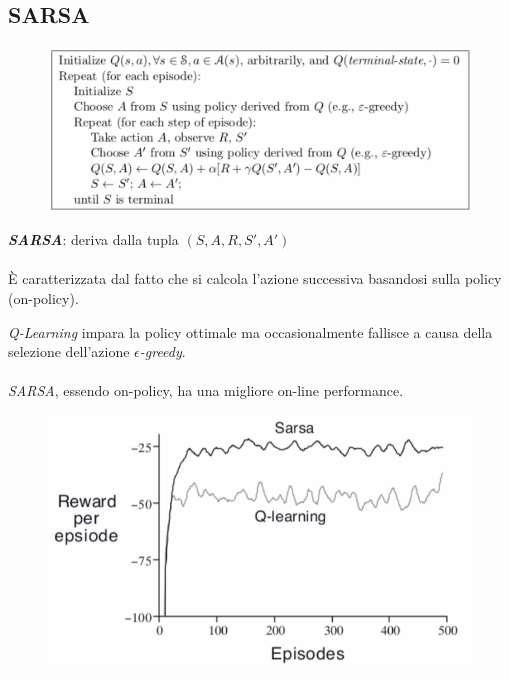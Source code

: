 \documentclass[a4paper, notitlepage, 9pt]{extreport}
\begin{document}
\subsection*{SARSA}
\begin{multicols}{2}
	\begin{figure}[H]
		\centering
		\includegraphics[scale=0.20]{SARSA}
	\end{figure}
	\columnbreak
	\noindent
	\textit{\textbf{SARSA}}: deriva dalla tupla $(S, A, R, S', A')$\\\\
	È caratterizzata dal fatto che si calcola l'azione successiva basandosi sulla policy (on-policy).	
\end{multicols}
\begin{multicols}{2}
	\noindent
	\textit{Q-Learning} impara la policy ottimale ma occasionalmente fallisce a causa della selezione dell'azione $\epsilon$\textit{-greedy}.\\\\
	\textit{SARSA}, essendo on-policy, ha una migliore on-line performance.
	\columnbreak
	\begin{figure}[H]
		\centering
		\includegraphics[scale=0.27]{QvsS}
	\end{figure}	
\end{multicols}
\end{document}
